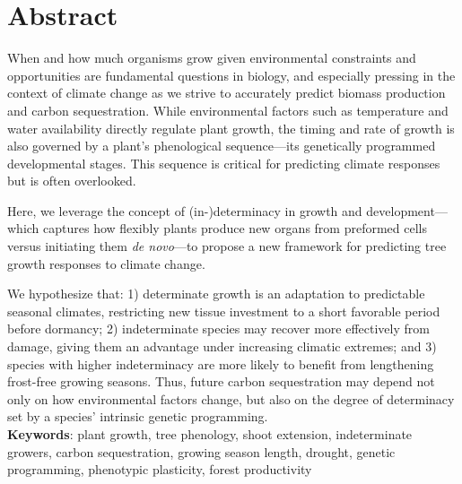 \documentclass{article}
\begin{document}
	
	
\section*{Abstract} %
	When and how much organisms grow given environmental constraints and opportunities are fundamental questions in biology, and especially pressing in the context of climate change as we strive to accurately predict biomass production and carbon sequestration. While environmental factors such as temperature and water availability directly regulate plant growth, the timing and rate of growth is also governed by a plant’s phenological sequence—its genetically programmed developmental stages. This sequence is critical for predicting climate responses but is often overlooked.
	
	Here, we leverage the concept of (in-)determinacy in growth and development—which captures how flexibly plants produce new organs from preformed cells versus initiating them \textit{de novo}—to propose a new framework for predicting tree growth responses to climate change.
	
	We hypothesize that: 1) determinate growth is an adaptation to predictable seasonal climates, restricting new tissue investment to a short favorable period before dormancy; 2) indeterminate species may recover more effectively from damage, giving them an advantage under increasing climatic extremes; and 3) species with higher indeterminacy are more likely to benefit from lengthening frost-free growing seasons. 
	Thus, future carbon sequestration may depend not only on how environmental factors change, but also on the degree of determinacy set by a species’ intrinsic genetic programming.\\
		
			\textbf{Keywords}: plant growth, tree phenology, shoot extension, indeterminate growers, carbon sequestration, growing season length, drought, genetic programming, phenotypic plasticity, forest productivity
			\newpage
			
\end{document}
